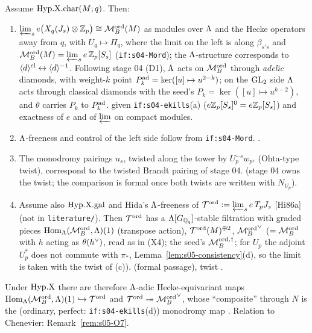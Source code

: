 \begin{proposition}\label{prop:s05-Xlambda}
Assume $\mathrm{Hyp.X.char}(M;q)$. Then:
\begin{enumerate}[label=(\alph*)]
\item $\varprojlim_s e\big(X_q(J_s)\otimes\mathbb{Z}_p\big)\cong\mathcal{M}^{\mathrm{ord}}_B(M)$ as modules over $\Lambda$ and the Hecke operators away from $q$,
  with $U_q\mapsto\Pi_q$, where the limit on the left is along $\beta_{s's}$ and $\mathcal{M}^{\mathrm{ord}}_B(M)=\varprojlim_se\,\mathbb{Z}_p[S_s]$ (\texttt{if:s04-Mord});
  the $\Lambda$-structure corresponds to $\langle d\rangle^{\rm cl}\leftrightarrow\langle d\rangle^{-1}$. Following stage 04 (D1),
  $\Lambda$ acts on $\mathcal{M}^{\mathrm{ord}}_B$ through \emph{adelic} diamonds, with weight-$k$ point $P^{\rm ad}_k=\ker([u]\mapsto u^{2-k})$; on the
  $\mathrm{GL}_2$ side $\Lambda$ acts through classical diamonds with the seed's $P_k=\ker([u]\mapsto u^{k-2})$, and $\theta$ carries $P_k$ to
  $P^{\rm ad}_k$. \stproved{} given
  \texttt{if:s04-ekills}(a) ($e\mathbb{Z}_p[S_s]^0=e\mathbb{Z}_p[S_s]$) and exactness of $e$ and of $\varprojlim$ on compact modules.
\item $\Lambda$-freeness and control of the left side follow from \texttt{if:s04-Mord}. \stpmc.
\item The monodromy pairings $u_s$, twisted along the tower by $U_p^{-s}w_{p^s}$ (Ohta-type twist), correspond to the twisted Brandt
  pairing of stage 04. \stsketch{} (stage 04 owns the twist; the comparison is formal once both twists are written with $N_{U_p}$).
\item Assume also $\mathrm{Hyp.X.gal}$ and Hida's $\Lambda$-freeness of $\mathcal{T}^{\mathrm{ord}}:=\varprojlim_se\,T_pJ_s$ [Hi86a] (not in \texttt{literature/}).
  Then $\mathcal{T}^{\mathrm{ord}}$ has a $\Lambda[G_{\mathbb{Q}_q}]$-stable filtration with graded pieces $\operatorname{Hom}_\Lambda(\mathcal{M}^{\mathrm{ord}}_B,\Lambda)(1)$ (transpose action),
  $\mathcal{T}^{\mathrm{ord}}(M)^{\oplus2}$, ${\mathcal{M}^{\mathrm{ord}}_B}^{\vee}$ ($=\mathcal{M}^{\mathrm{ord}}_B$ with $h$ acting as $\theta(h^\vee)$, read as in (X4); the seed's
  $\mathcal{M}^{\rm ord,\dagger}_B$; for $U_p$ the adjoint $U_p^*$ does not commute with $\pi_*$, Lemma~\ref{lem:s05-consistency}(d), so the
  limit is taken with the twist of (c)). \stpmc{}
  (formal passage), twist \stsketch.
\end{enumerate}
\end{proposition}
\noindent Under $\mathrm{Hyp.X}$ there are therefore $\Lambda$-adic Hecke-equivariant maps
$\operatorname{Hom}_\Lambda(\mathcal{M}^{\mathrm{ord}}_B,\Lambda)(1)\hookrightarrow\mathcal{T}^{\mathrm{ord}}$ and $\mathcal{T}^{\mathrm{ord}}\twoheadrightarrow{\mathcal{M}^{\mathrm{ord}}_B}^{\vee}$, whose ``composite'' through $N$ is the
(ordinary, perfect: \texttt{if:s04-ekills}(d)) monodromy map \stsketch.
 Relation to Chenevier: Remark~\ref{rem:s05-O7}.


